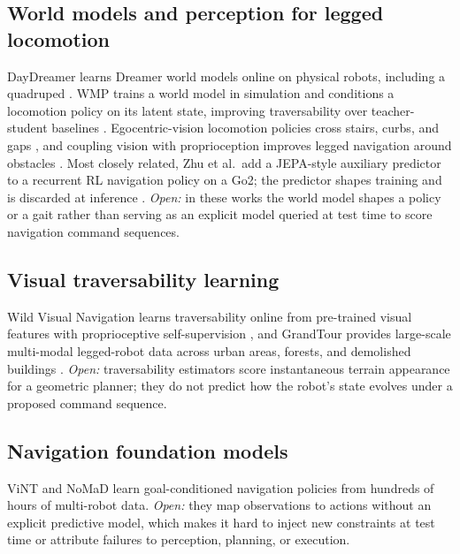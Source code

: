 \documentclass[conference]{IEEEtran}
\begin{document}
\subsection{World models and perception for legged locomotion}
DayDreamer learns Dreamer world models online on physical robots,
including a quadruped \cite{wu2022daydreamer}. WMP trains a world model
in simulation and conditions a locomotion policy on its latent state,
improving traversability over teacher-student baselines
\cite{lai2024wmp}. Egocentric-vision locomotion policies cross stairs,
curbs, and gaps \cite{agarwal2022egocentric}, and coupling vision with
proprioception improves legged navigation around obstacles
\cite{fu2022coupling}. Most closely related, Zhu et al.\ add a
JEPA-style auxiliary predictor to a recurrent RL navigation policy on a
Go2; the predictor shapes training and is discarded at inference
\cite{zhu2026predictive}.
\emph{Open:} in these works the world model shapes a policy or a gait
rather than serving as an explicit model queried at test time to score
navigation command sequences.

\subsection{Visual traversability learning}
Wild Visual Navigation learns traversability online from pre-trained
visual features with proprioceptive self-supervision
\cite{mattamala2024wvn}, and GrandTour provides large-scale multi-modal
legged-robot data across urban areas, forests, and demolished buildings
\cite{tuna2026grandtour}.
\emph{Open:} traversability estimators score instantaneous terrain
appearance for a geometric planner; they do not predict how the robot's
state evolves under a proposed command sequence.

\subsection{Navigation foundation models}
ViNT \cite{shah2023vint} and NoMaD \cite{sridhar2024nomad} learn
goal-conditioned navigation policies from hundreds of hours of
multi-robot data.
\emph{Open:} they map observations to actions without an explicit
predictive model, which makes it hard to inject new constraints at test
time or attribute failures to perception, planning, or execution.
\end{document}
